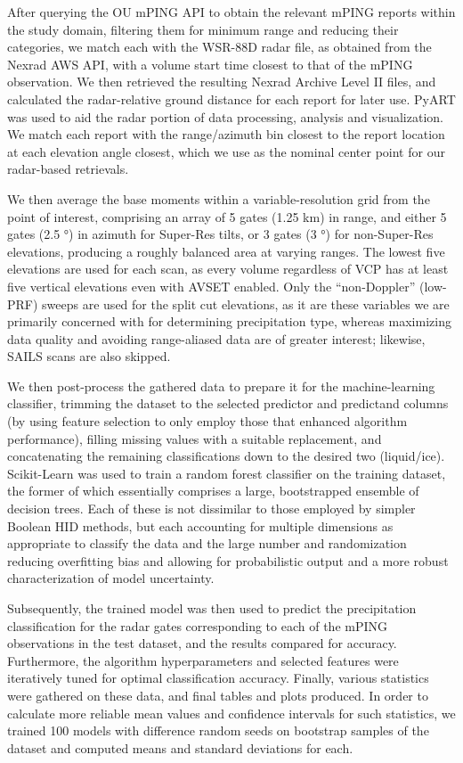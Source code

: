 \documentclass{agujournal}
\begin{document}
After querying the OU mPING API to obtain the relevant mPING reports within the study domain, filtering them for minimum range and reducing their categories, we  match each with the WSR-88D radar file, as obtained from the Nexrad AWS API, with a volume start time closest to that of the mPING observation. We then retrieved the resulting Nexrad Archive Level II files, and calculated the radar-relative ground distance for each report for later use. PyART \parencite{Helmus2016} was used to aid the radar portion of data processing, analysis and visualization. We match each report with the range/azimuth bin closest to the report location at each elevation angle closest, which we use as the nominal center point for our radar-based retrievals.

We then average the base moments within a variable-resolution grid from the point of interest, comprising an array of 5 gates (1.25 km) in range, and either 5 gates (2.5 \si{\degree}) in azimuth for Super-Res tilts, or 3 gates (3 \si{\degree}) for non-Super-Res elevations, producing a roughly balanced area at varying ranges.  The lowest five elevations are used for each scan, as every volume regardless of VCP has at least five vertical elevations even with AVSET enabled. Only the ``non-Doppler'' (low-PRF) sweeps are used for the split cut elevations, as it are these variables we are primarily concerned with for determining precipitation type, whereas maximizing data quality and avoiding range-aliased data are of greater interest; likewise, SAILS scans are also skipped.

We then post-process the gathered data to prepare it for the machine-learning classifier, trimming the dataset to the selected predictor and predictand columns (by using feature selection to only employ those that enhanced algorithm performance), filling missing values with a suitable replacement, and concatenating the remaining classifications down to the desired two (liquid/ice). Scikit-Learn \parencite{scikit-learn} was used to train a random forest classifier on the training dataset, the former of which essentially comprises a large, bootstrapped ensemble of decision trees. Each of these is not dissimilar to those employed by simpler Boolean HID methods, but each accounting for multiple dimensions as appropriate to classify the data and the large number and randomization reducing overfitting bias and allowing for probabilistic output and a more robust characterization of model uncertainty.

Subsequently, the trained model was then used to predict the precipitation classification for the radar gates corresponding to each of the mPING observations in the test dataset, and the results compared for accuracy. Furthermore, the algorithm hyperparameters and selected features were iteratively tuned for optimal classification accuracy. Finally, various statistics were gathered on these data, and final tables and plots produced. In order to calculate more reliable mean values and confidence intervals for such statistics, we trained 100 models with difference random seeds on bootstrap samples of the dataset and computed means and standard deviations for each.
\end{document}
